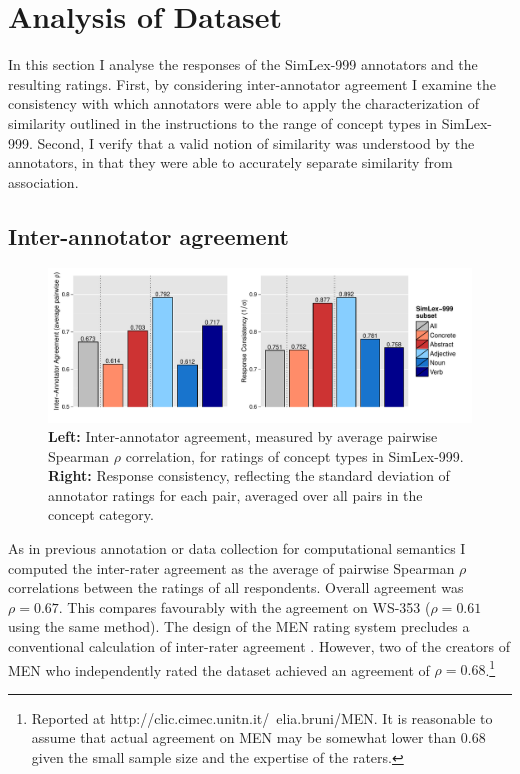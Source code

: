 \section{Analysis of Dataset}
\label{analysis}
In this section I analyse the responses of the SimLex-999 annotators and the resulting ratings. First, by considering inter-annotator agreement I examine the consistency with which annotators were able to apply the characterization of similarity outlined in the instructions to the range of concept types in SimLex-999. Second, I verify that a valid notion of similarity was understood by the annotators, in that they were able to accurately separate similarity from association. 

\subsection{Inter-annotator agreement}

\begin{figure}[ht]  \includegraphics[width = \textwidth]{Chapter_2/Figure_1A_CL}  \caption{\label{fig4} {\bf Left:} Inter-annotator agreement, measured by average pairwise Spearman \(\rho\) correlation, for ratings of concept types in SimLex-999. {\bf Right:} Response consistency, reflecting the standard deviation of annotator ratings for each pair, averaged over all pairs in the concept category.}\end{figure}  

As in previous annotation or data collection for computational semantics \cite{pado2007flexible,reisinger2010mixture,silberer2014learning} I computed the inter-rater agreement as the average of pairwise Spearman \(\rho\) correlations between the ratings of all respondents. Overall agreement was \(\rho=0.67\). This compares favourably with the agreement on WS-353 (\(\rho=0.61\) using the same method). The design of the MEN rating system precludes a conventional calculation of inter-rater agreement \cite{bruni2012distributional2}. However, two of the creators of MEN who independently rated the dataset achieved an agreement of \(\rho=0.68\).\footnote{Reported at http://clic.cimec.unitn.it/~elia.bruni/MEN. It is reasonable to assume that actual agreement on MEN may be somewhat lower than 0.68 given the small sample size and the expertise of the raters.} 


